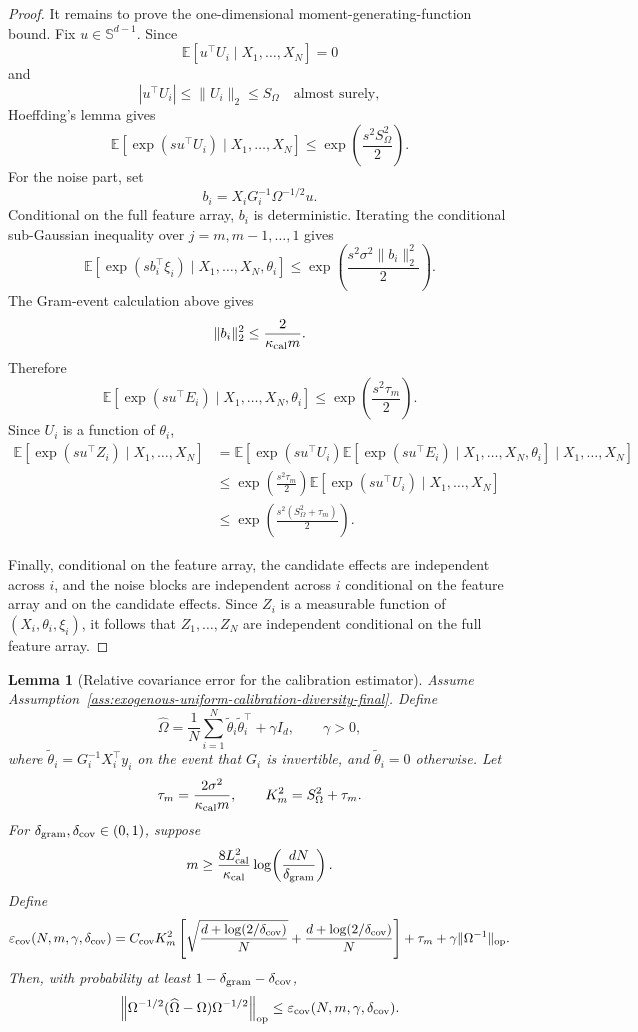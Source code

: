 \documentclass{article} %
\newtheorem{lemma}[theorem]{Lemma}
\begin{document}
\begin{proof}
It remains to prove the one-dimensional moment-generating-function bound.
Fix \(u\in\mathbb{S}^{d-1}\).  Since
\[
\mathbb{E}[u^\top U_i\mid X_1,\ldots,X_N]=0
\]
and
\[
|u^\top U_i|\le \|U_i\|_2\le S_\Omega
\quad\text{almost surely},
\]
Hoeffding's lemma gives
\[
\mathbb{E}\!\left[
\exp(su^\top U_i)\mid X_1,\ldots,X_N
\right]
\le
\exp\!\left(\frac{s^2S_\Omega^2}{2}\right).
\]
For the noise part, set
\[
b_i=X_iG_i^{-1}\Omega^{-1/2}u.
\]
Conditional on the full feature array, \(b_i\) is deterministic.  Iterating the
conditional sub-Gaussian inequality over \(j=m,m-1,\ldots,1\) gives
\[
\mathbb{E}\!\left[
\exp(sb_i^\top\xi_i)
\mid X_1,\ldots,X_N,\theta_i
\right]
\le
\exp\!\left(\frac{s^2\sigma^2\|b_i\|_2^2}{2}\right).
\]
The Gram-event calculation above gives
\[
\|b_i\|_2^2\le \frac{2}{\kappa_{\rm cal}m}.
\]
Therefore
\[
\mathbb{E}\!\left[
\exp(su^\top E_i)
\mid X_1,\ldots,X_N,\theta_i
\right]
\le
\exp\!\left(\frac{s^2\tau_m}{2}\right).
\]
Since \(U_i\) is a function of \(\theta_i\),
\[
\begin{aligned}
\mathbb{E}\!\left[
\exp(su^\top Z_i)\mid X_1,\ldots,X_N
\right]
&=
\mathbb{E}\!\left[
\exp(su^\top U_i)
\mathbb{E}\!\left[
\exp(su^\top E_i)
\mid X_1,\ldots,X_N,\theta_i
\right]
\mid X_1,\ldots,X_N
\right]
\\
&\le
\exp\!\left(\frac{s^2\tau_m}{2}\right)
\mathbb{E}\!\left[
\exp(su^\top U_i)\mid X_1,\ldots,X_N
\right]
\\
&\le
\exp\!\left(\frac{s^2(S_\Omega^2+\tau_m)}{2}\right).
\end{aligned}
\]

Finally, conditional on the feature array, the candidate effects are independent
across \(i\), and the noise blocks are independent across \(i\) conditional on
the feature array and on the candidate effects.  Since \(Z_i\) is a measurable
function of \((X_i,\theta_i,\xi_i)\), it follows that
\(Z_1,\ldots,Z_N\) are independent conditional on the full feature array.
\end{proof}

\begin{lemma}[Relative covariance error for the calibration estimator]
\label{lem:relative-covariance-error-final}
Assume Assumption~\ref{ass:exogenous-uniform-calibration-diversity-final}.
Define
\[
\widehat\Omega
=
\frac1N\sum_{i=1}^N \widetilde\theta_i\widetilde\theta_i^\top+\gamma I_d,
\qquad
\gamma>0,
\]
where \(\widetilde\theta_i=G_i^{-1}X_i^\top y_i\) on the event that \(G_i\) is
invertible, and \(\widetilde\theta_i=0\) otherwise.  Let
\[
\tau_m=\frac{2\sigma^2}{\kappa_{\rm cal}m},
\qquad
K_m^2=S_\Omega^2+\tau_m.
\]
For \(\delta_{\rm gram},\delta_{\rm cov}\in(0,1)\), suppose
\[
m
\ge
\frac{8L_{\rm cal}^2}{\kappa_{\rm cal}}
\log\!\left(\frac{dN}{\delta_{\rm gram}}\right).
\]
Define
\[
\varepsilon_{\rm cov}(N,m,\gamma,\delta_{\rm cov})
=
C_{\rm cov}K_m^2
\left[
\sqrt{\frac{d+\log(2/\delta_{\rm cov})}{N}}
+
\frac{d+\log(2/\delta_{\rm cov})}{N}
\right]
+
\tau_m
+
\gamma\|\Omega^{-1}\|_{\mathrm{op}}.
\]
Then, with probability at least \(1-\delta_{\rm gram}-\delta_{\rm cov}\),
\[
\left\|
\Omega^{-1/2}(\widehat\Omega-\Omega)\Omega^{-1/2}
\right\|_{\mathrm{op}}
\le
\varepsilon_{\rm cov}(N,m,\gamma,\delta_{\rm cov}).
\]
\end{lemma}
\end{document}
